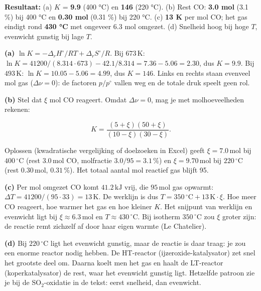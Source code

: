 \begin{oplossing}
\textbf{Resultaat:} (a) \(K\) = \textbf{9.9} (400 °C) en \textbf{146} (220 °C). (b) Rest CO: \textbf{3.0 mol} (3.1 \%) bij 400 °C en \textbf{0.30 mol} (0.31 \%) bij 220 °C. (c) \textbf{13 K} per mol CO; het gas eindigt rond \textbf{430 °C} met ongeveer 6.3 mol omgezet. (d) Snelheid hoog bij hoge \(T\), evenwicht gunstig bij lage \(T\).

\textbf{(a)} \(\ln K = -\Delta_r H^\circ/RT + \Delta_r S^\circ/R\). Bij \(673\,\mathrm{K}\): \(\ln K = 41200/(8.314\cdot673) - 42.1/8.314 = 7.36 - 5.06 = 2.30\), dus \(K = 9.9\). Bij \(493\,\mathrm{K}\): \(\ln K = 10.05 - 5.06 = 4.99\), dus \(K = 146\). Links en rechts staan evenveel mol gas (\(\Delta\nu = 0\)): de factoren \(p/p^\circ\) vallen weg en de totale druk speelt geen rol.

\textbf{(b)} Stel dat \(\xi\) mol CO reageert. Omdat \(\Delta\nu = 0\), mag je met molhoeveelheden rekenen:

\[
K = \frac{(5+\xi)(50+\xi)}{(10-\xi)(30-\xi)}.
\]

Oplossen (kwadratische vergelijking of doelzoeken in Excel) geeft \(\xi = 7.0\,\mathrm{mol}\) bij \(400\,^\circ\mathrm{C}\) (rest \(3.0\,\mathrm{mol}\) CO, molfractie \(3.0/95 = 3.1\,\%\)) en \(\xi = 9.70\,\mathrm{mol}\) bij \(220\,^\circ\mathrm{C}\) (rest \(0.30\,\mathrm{mol}\), \(0.31\,\%\)). Het totaal aantal mol reactief gas blijft 95.

\textbf{(c)} Per mol omgezet CO komt \(41.2\,\mathrm{kJ}\) vrij, die \(95\,\mathrm{mol}\) gas opwarmt: \(\Delta T = 41200/(95\cdot33) = 13\,\mathrm{K}\). De werklijn is dus \(T = 350\,^\circ\mathrm{C} + 13\,\mathrm{K}\cdot\xi\). Hoe meer CO reageert, hoe warmer het gas en hoe kleiner \(K\). Het snijpunt van werklijn en evenwicht ligt bij \(\xi \approx 6.3\,\mathrm{mol}\) en \(T \approx 430\,^\circ\mathrm{C}\). Bij isotherm \(350\,^\circ\mathrm{C}\) zou \(\xi\) groter zijn: de reactie remt zichzelf af door haar eigen warmte (Le Chatelier).

\textbf{(d)} Bij \(220\,^\circ\mathrm{C}\) ligt het evenwicht gunstig, maar de reactie is daar traag: je zou een enorme reactor nodig hebben. De HT-reactor (ijzeroxide-katalysator) zet snel het grootste deel om. Daarna koelt men het gas en haalt de LT-reactor (koperkatalysator) de rest, waar het evenwicht gunstig ligt. Hetzelfde patroon zie je bij de SO\(_2\)-oxidatie in de tekst: eerst snelheid, dan evenwicht.
\end{oplossing}

